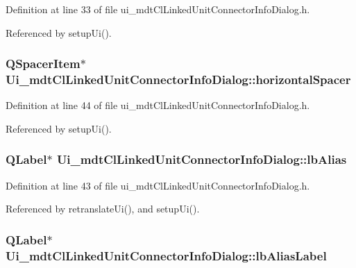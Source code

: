 Definition at line 33 of file ui\-\_\-mdt\-Cl\-Linked\-Unit\-Connector\-Info\-Dialog.\-h.



Referenced by setup\-Ui().

\hypertarget{class_ui__mdt_cl_linked_unit_connector_info_dialog_aaaa925ff91f3f54fcfb3fd54a1d1b90c}{
\subsubsection[{horizontal\-Spacer}]{\setlength{\rightskip}{0pt plus 5cm}Q\-Spacer\-Item$\ast$ Ui\-\_\-mdt\-Cl\-Linked\-Unit\-Connector\-Info\-Dialog\-::horizontal\-Spacer}}\label{class_ui__mdt_cl_linked_unit_connector_info_dialog_aaaa925ff91f3f54fcfb3fd54a1d1b90c}


Definition at line 44 of file ui\-\_\-mdt\-Cl\-Linked\-Unit\-Connector\-Info\-Dialog.\-h.



Referenced by setup\-Ui().

\hypertarget{class_ui__mdt_cl_linked_unit_connector_info_dialog_a1a801d935c2798f307fa61155cf90266}{
\subsubsection[{lb\-Alias}]{\setlength{\rightskip}{0pt plus 5cm}Q\-Label$\ast$ Ui\-\_\-mdt\-Cl\-Linked\-Unit\-Connector\-Info\-Dialog\-::lb\-Alias}}\label{class_ui__mdt_cl_linked_unit_connector_info_dialog_a1a801d935c2798f307fa61155cf90266}


Definition at line 43 of file ui\-\_\-mdt\-Cl\-Linked\-Unit\-Connector\-Info\-Dialog.\-h.



Referenced by retranslate\-Ui(), and setup\-Ui().

\hypertarget{class_ui__mdt_cl_linked_unit_connector_info_dialog_a99e6d3836dedd8dda30fc45f448f7071}{
\subsubsection[{lb\-Alias\-Label}]{\setlength{\rightskip}{0pt plus 5cm}Q\-Label$\ast$ Ui\-\_\-mdt\-Cl\-Linked\-Unit\-Connector\-Info\-Dialog\-::lb\-Alias\-Label}}\label{class_ui__mdt_cl_linked_unit_connector_info_dialog_a99e6d3836dedd8dda30fc45f448f7071}


